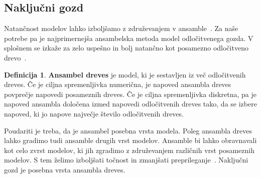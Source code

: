 \documentclass[12pt,a4paper,twoside]{article}
\theoremstyle{definition} %
\newtheorem{definicija}{Definicija}[section]
\theoremstyle{plain} %
\numberwithin{equation}{section}  %
\begin{document}
\subsection{Naključni gozd}

Natančnost modelov lahko izboljšamo z združevanjem v ansamble~\cite{zhou2012ensemble}.
Za naše potrebe pa je najprimernejša ansambelska metoda model odločitvenega gozda. 
V splošnem se izkaže za zelo uspešno in bolj natančno kot posamezno odločitveno drevo~\cite[pogl.\ 4]{louppe2015understanding}. 

\begin{definicija}
\textbf{Ansambel dreves} je model, ki je sestavljen iz več odločitvenih dreves. 
Če je ciljna spremenljivka numerična, je napoved ansambla dreves povprečje napovedi posameznih dreves. 
Če je ciljna spremenljivka diskretna, pa je napoved ansambla določena izmed napovedi odločitvenih dreves tako, da se izbere napoved, ki jo napove največje število odločitvenih dreves.
\end{definicija}

Poudariti je treba, da je ansambel posebna vrsta modela. 
Poleg ansambla dreves lahko gradimo tudi ansamble drugih vrst modelov. 
Ansamble bi lahko obravnavali kot celo zvrst modelov, ki jih zgradimo z združevanjem različnih vrst posameznih modelov. 
S tem želimo izboljšati točnost in zmanjšati preprileganje~\cite{zhou2012ensemble}. 
Naključni gozd je posebna vrsta ansambla dreves. %
\end{document}
